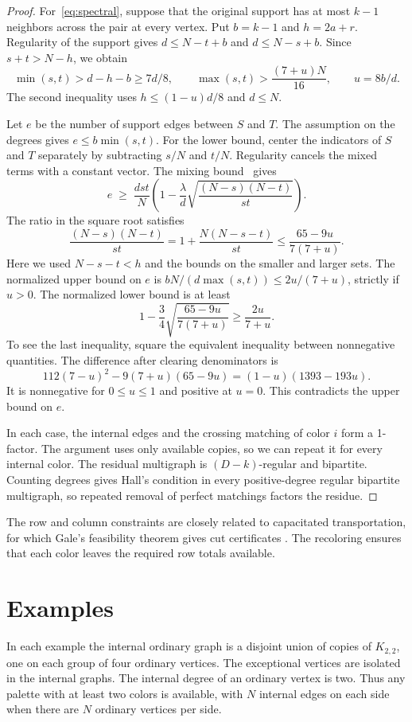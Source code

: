 \documentclass[11pt]{article}
\begin{document}
\begin{proof}
For~\eqref{eq:spectral}, suppose that the original support has at most \(k-1\) neighbors across the pair at every vertex. Put \(b=k-1\) and \(h=2a+r\). Regularity of the support gives \(d\le N-t+b\) and \(d\le N-s+b\). Since \(s+t>N-h\), we obtain
\[
 \min(s,t)>d-h-b\ge 7d/8,\qquad
 \max(s,t)>\frac{(7+u)N}{16},\qquad u=8b/d.
\]
The second inequality uses \(h\le (1-u)d/8\) and \(d\le N\).

Let \(e\) be the number of support edges between \(S\) and \(T\). The assumption on the degrees gives \(e\le b\min(s,t)\). For the lower bound, center the indicators of \(S\) and \(T\) separately by subtracting \(s/N\) and \(t/N\). Regularity cancels the mixed terms with a constant vector. The mixing bound~\cite{Haemers} gives
\[
 e\;\ge\;\frac{dst}{N}
 \left(1-\frac{\lambda}{d}\sqrt{\frac{(N-s)(N-t)}{st}}\right).
\]
The ratio in the square root satisfies
\[
 \frac{(N-s)(N-t)}{st}
 =1+\frac{N(N-s-t)}{st}
 \le \frac{65-9u}{7(7+u)} .
\]
Here we used \(N-s-t<h\) and the bounds on the smaller and larger sets. The normalized upper bound on \(e\) is \(bN/(d\max(s,t))\le 2u/(7+u)\), strictly if \(u>0\). The normalized lower bound is at least
\[
 1-\frac34\sqrt{\frac{65-9u}{7(7+u)}}\ge \frac{2u}{7+u}.
\]
To see the last inequality, square the equivalent inequality between nonnegative quantities. The difference after clearing denominators is
\[
 112(7-u)^2-9(7+u)(65-9u)=(1-u)(1393-193u).
\]
It is nonnegative for \(0\le u\le1\) and positive at \(u=0\). This contradicts the upper bound on \(e\).

In each case, the internal edges and the crossing matching of color \(i\) form a 1-factor. The argument uses only available copies, so we can repeat it for every internal color. The residual multigraph is \((D-k)\)-regular and bipartite. Counting degrees gives Hall's condition in every positive-degree regular bipartite multigraph, so repeated removal of perfect matchings factors the residue.
\end{proof}

The row and column constraints are closely related to capacitated transportation, for which Gale's feasibility theorem gives cut certificates \cite{Gale}. The recoloring ensures that each color leaves the required row totals available.

\section{Examples}\label{sec:examples}

In each example the internal ordinary graph is a disjoint union of copies of \(K_{2,2}\), one on each group of four ordinary vertices. The exceptional vertices are isolated in the internal graphs. The internal degree of an ordinary vertex is two. Thus any palette with at least two colors is available, with \(N\) internal edges on each side when there are \(N\) ordinary vertices per side.
\end{document}
